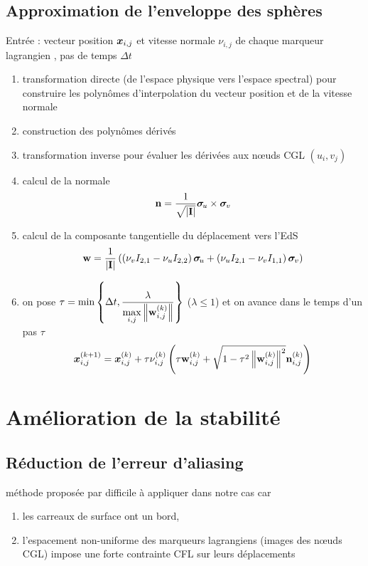 \subsection{Approximation de l'enveloppe des sphères}%
Entrée : vecteur position $\boldsymbol{x}_{i,j}$ et vitesse normale $\nu_{i,j}$ de chaque marqueur lagrangien , pas de temps $\Delta t$
\begin{enumerate}
	\item transformation directe (de l'espace physique vers l'espace spectral) pour construire les polynômes d'interpolation du vecteur position et de la vitesse normale
	\item construction des polynômes dérivés 
	\item transformation inverse pour évaluer les dérivées aux n\oe uds CGL $(u_i,v_j)$
	\item calcul de la normale 
	\begin{equation}
		\mathbf{n} = \frac{1}{\sqrt{\left\lvert {\mathbf{I}} \right\rvert}} {\boldsymbol{\sigma}_{\mkern-3muu}} \times {\boldsymbol{\sigma}_{\mkern-2muv}}
	\end{equation}
	\item calcul de la composante tangentielle du déplacement vers l'EdS
	\begin{equation}
		\mathbf{w} = \frac{1}{\left\lvert {\mathbf{I}} \right\rvert} 
		\left(
			\left( \nu_v I_{2,1} - \nu_u I_{2,2} \right)\boldsymbol{\sigma}_{\mkern-3muu} + 
			\left( \nu_u I_{2,1} - \nu_v I_{1,1} \right)\boldsymbol{\sigma}_{\mkern-2muv}
		\right)
	\end{equation}
	\item on pose $\tau = \min\left\{\Delta t, \displaystyle\frac{\lambda}{\displaystyle\max_{i,j} \left\| {\mathbf{w}_{i,j}^{(k)} } \right\|} \right\}$ ($\lambda \leq 1$) et on avance dans le temps d'un pas $\tau$
	\begin{equation}
		\boldsymbol{x}_{i,j}^{(k+1)} = \boldsymbol{x}_{i,j}^{(k)} + \tau \nu_{i,j}^{(k)} 
		\left( 
			\tau \mathbf{w}_{i,j}^{(k)} + \sqrt{1 - \tau^2 \left\| {\mathbf{w}_{i,j}^{(k)}} \right\|^2} \mathbf{n}_{i,j}^{(k)}
		\right)
	\end{equation}
\end{enumerate}

\section{Amélioration de la stabilité}
\subsection{Réduction de l'erreur d'aliasing}
méthode proposée par \cite{rahimian2015} difficile à appliquer dans notre cas car 
\begin{enumerate}
	\item les carreaux de surface ont un bord, 
	\item l'espacement non-uniforme des marqueurs lagrangiens (images des n\oe uds CGL) impose une forte contrainte CFL sur leurs déplacements
	
\end{enumerate}

